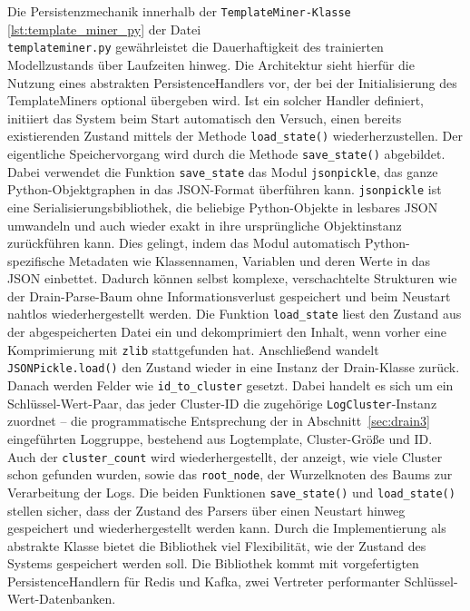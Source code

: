 Die Persistenzmechanik innerhalb der \lstinline{TemplateMiner-Klasse} \ref{lst:template_miner_py} der Datei \\ \texttt{templateminer.py} gewährleistet die Dauerhaftigkeit des trainierten Modellzustands über Laufzeiten hinweg. Die Architektur sieht hierfür die Nutzung eines abstrakten PersistenceHandlers vor, der bei der Initialisierung des TemplateMiners optional übergeben wird. Ist ein solcher Handler definiert, initiiert das System beim Start automatisch den Versuch, einen bereits existierenden Zustand mittels der Methode \lstinline{load_state()} wiederherzustellen. Der eigentliche Speichervorgang wird durch die Methode \lstinline{save_state()} abgebildet. Dabei verwendet die Funktion \lstinline{save_state} das Modul \lstinline{jsonpickle}, das ganze Python-Objektgraphen in das JSON-Format überführen kann. \lstinline{jsonpickle} ist eine Serialisierungsbibliothek, die beliebige Python-Objekte in lesbares JSON umwandeln und auch wieder exakt in ihre ursprüngliche Objektinstanz zurückführen kann. Dies gelingt, indem das Modul automatisch Python-spezifische Metadaten wie Klassennamen, Variablen und deren Werte in das JSON einbettet. Dadurch können selbst komplexe, verschachtelte Strukturen wie der Drain-Parse-Baum ohne Informationsverlust gespeichert und beim Neustart nahtlos wiederhergestellt werden. Die Funktion \lstinline{load_state} liest den Zustand aus der abgespeicherten Datei ein und dekomprimiert den Inhalt, wenn vorher eine Komprimierung mit \lstinline{zlib} stattgefunden hat.  Anschließend wandelt \lstinline{JSONPickle.load()} den Zustand wieder in eine Instanz der Drain-Klasse zurück. Danach werden Felder wie \lstinline{id_to_cluster} gesetzt. Dabei handelt es sich um ein Schlüssel-Wert-Paar, das jeder Cluster-ID die zugehörige \texttt{LogCluster}-Instanz zuordnet -- die programmatische Entsprechung der in Abschnitt~\ref{sec:drain3} eingeführten Loggruppe, bestehend aus Logtemplate, Cluster-Größe und ID. Auch der \lstinline{cluster_count} wird wiederhergestellt, der anzeigt, wie viele Cluster schon gefunden wurden, sowie das \lstinline{root_node}, der Wurzelknoten des Baums zur Verarbeitung der Logs. 
Die beiden Funktionen \lstinline{save_state()} und \lstinline{load_state()} stellen sicher, dass der Zustand des Parsers über einen Neustart hinweg gespeichert und wiederhergestellt werden kann. Durch die Implementierung als abstrakte Klasse bietet die Bibliothek viel Flexibilität, wie der Zustand des Systems gespeichert werden soll. Die Bibliothek kommt mit vorgefertigten PersistenceHandlern für Redis und Kafka, zwei Vertreter performanter Schlüssel-Wert-Datenbanken. 

